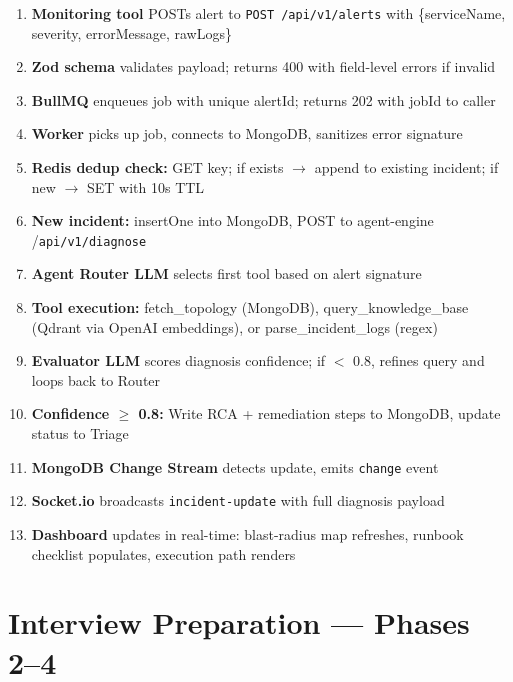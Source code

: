 \documentclass[11pt,a4paper]{article}
\begin{document}
\begin{tcolorbox}[colback=primary!5, colframe=primary, sharp corners, title=\textbf{Complete Alert-to-Remediation Pipeline}]
\begin{enumerate}[leftmargin=*,itemsep=3pt]
  \item \textbf{Monitoring tool} POSTs alert to \texttt{POST /api/v1/alerts} with \{serviceName, severity, errorMessage, rawLogs\}
  \item \textbf{Zod schema} validates payload; returns 400 with field-level errors if invalid
  \item \textbf{BullMQ} enqueues job with unique alertId; returns 202 with jobId to caller
  \item \textbf{Worker} picks up job, connects to MongoDB, sanitizes error signature
  \item \textbf{Redis dedup check:} GET key; if exists $\rightarrow$ append to existing incident; if new $\rightarrow$ SET with 10s TTL
  \item \textbf{New incident:} insertOne into MongoDB, POST to agent-engine /\texttt{api/v1/diagnose}
  \item \textbf{Agent Router LLM} selects first tool based on alert signature
  \item \textbf{Tool execution:} fetch\_topology (MongoDB), query\_knowledge\_base (Qdrant via OpenAI embeddings), or parse\_incident\_logs (regex)
  \item \textbf{Evaluator LLM} scores diagnosis confidence; if $<$ 0.8, refines query and loops back to Router
  \item \textbf{Confidence $\geq$ 0.8:} Write RCA + remediation steps to MongoDB, update status to Triage
  \item \textbf{MongoDB Change Stream} detects update, emits \texttt{change} event
  \item \textbf{Socket.io} broadcasts \texttt{incident-update} with full diagnosis payload
  \item \textbf{Dashboard} updates in real-time: blast-radius map refreshes, runbook checklist populates, execution path renders
\end{enumerate}
\end{tcolorbox}

\section{Interview Preparation — Phases 2--4}
\end{document}

